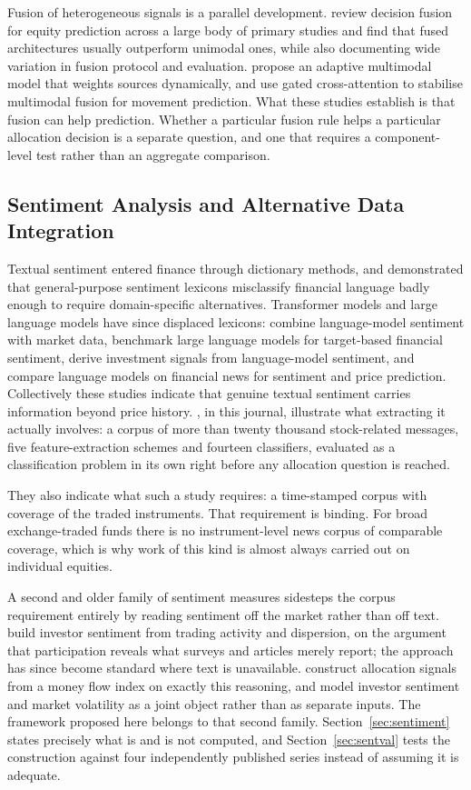 Fusion of heterogeneous signals is a parallel development. \citet{zhang22} review
decision fusion for equity prediction across a large body of primary studies and find
that fused architectures usually outperform unimodal ones, while also documenting wide
variation in fusion protocol and evaluation. \citet{farimani24} propose an adaptive
multimodal model that weights sources dynamically, and \citet{zong25} use gated
cross-attention to stabilise multimodal fusion for movement prediction. What these
studies establish is that fusion can help prediction. Whether a particular fusion rule
helps a particular allocation decision is a separate question, and one that requires a
component-level test rather than an aggregate comparison.

\subsection{Sentiment Analysis and Alternative Data Integration}

Textual sentiment entered finance through dictionary methods, and
\citet{loughran11} demonstrated that general-purpose sentiment lexicons misclassify
financial language badly enough to require domain-specific alternatives. Transformer
models and large language models have since displaced lexicons: \citet{officioso26}
combine language-model sentiment with market data, \citet{muhammad26} benchmark large
language models for target-based financial sentiment, \citet{mun25} derive investment
signals from language-model sentiment, and \citet{chuang25} compare language models on
financial news for sentiment and price prediction. Collectively these studies indicate
that genuine textual sentiment carries information beyond price history.
\citet{george25}, in this journal, illustrate what extracting it actually involves: a
corpus of more than twenty thousand stock-related messages, five feature-extraction
schemes and fourteen classifiers, evaluated as a classification problem in its own
right before any allocation question is reached.

They also indicate what such a study requires: a time-stamped corpus with coverage of
the traded instruments. That requirement is binding. For broad exchange-traded funds
there is no instrument-level news corpus of comparable coverage, which is why work of
this kind is almost always carried out on individual equities.

A second and older family of sentiment measures sidesteps the corpus requirement
entirely by reading sentiment off the market rather than off text. \citet{bakerwurgler07}
build investor sentiment from trading activity and dispersion, on the argument that
participation reveals what surveys and articles merely report; the approach has since
become standard where text is unavailable. \citet{singsiri26} construct allocation
signals from a money flow index on exactly this reasoning, and \citet{naidoo25} model
investor sentiment and market volatility as a joint object rather than as separate
inputs. The framework proposed here belongs to that second family.
Section~\ref{sec:sentiment} states precisely what is and is not computed, and
Section~\ref{sec:sentval} tests the construction against four independently published
series instead of assuming it is adequate.

